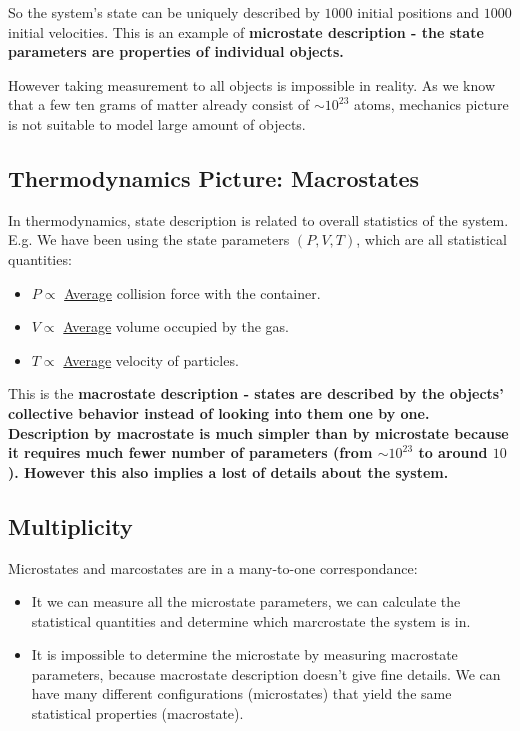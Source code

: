 \documentclass[class=article, crop=false, 12pt]{standalone}
\begin{document}
So the system's state can be uniquely described by $1000$ initial positions and $1000$ initial velocities.
This is an example of \bf{microstate description} - 
the state parameters are properties of individual objects.

However taking measurement to all objects is impossible in reality. 
As we know that a few ten grams of matter already consist of $\sim 10^{23}$ atoms, 
mechanics picture is not suitable to model large amount of objects.


\subsection{Thermodynamics Picture: Macrostates}

In thermodynamics,
state description is related to overall statistics of the system.
E.g. We have been using the state parameters $(P,V,T)$, which are all statistical quantities:
\begin{itemize}
    \item $P \propto$ \ul{Average} collision force with the container.
    \item $V \propto$ \ul{Average} volume occupied by the gas.
    \item $T \propto$ \ul{Average} velocity of particles. 
\end{itemize}


This is the \bf{macrostate description} - 
states are described by the objects' collective behavior instead of looking into them one by one. 
Description by macrostate is much simpler than by microstate because it requires much fewer number of parameters (from $\sim 10^{23}$ to around $10$). 
However this also implies a lost of details about the system.



\subsection{Multiplicity}

Microstates and marcostates are in a many-to-one correspondance:

\begin{itemize}
    \item It we can measure all the microstate parameters, 
    we can calculate the statistical quantities and determine which marcrostate the system is in.

    \item It is impossible to determine the microstate by measuring macrostate parameters, 
    because macrostate description doesn't give fine details. 
    We can have many different configurations (microstates) that yield the same statistical properties (macrostate). 

\end{itemize}
\end{document}
